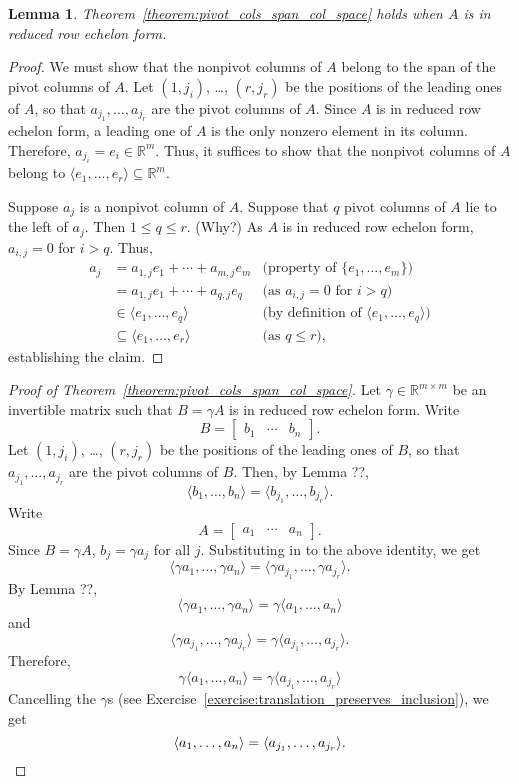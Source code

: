 \documentclass{amsart}
\newcommand{\RR}{\mathbb{R}}
\newtheorem{lemma}[theorem]{Lemma}
\theoremstyle{definition}
\begin{document}
\begin{lemma}
Theorem~\ref{theorem:pivot_cols_span_col_space} holds when $A$ is in reduced row echelon form.
\end{lemma}

\begin{proof}
We must show that the nonpivot columns of $A$ belong to the span of the pivot columns of $A$.
Let $(1, j_i)$, \ldots, $(r, j_r)$ be the positions of the leading ones of $A$, so that $a_{j_1},\ldots,a_{j_r}$ are the pivot columns of $A$.
Since $A$ is in reduced row echelon form, a leading one of $A$ is the only nonzero element in its column.
Therefore, $a_{j_i}=e_i\in\RR^m.$
Thus, it suffices to show that the nonpivot columns of $A$ belong to $\langle e_1,\ldots,e_r\rangle\subseteq \RR^m$.

Suppose $a_j$ is a nonpivot column of $A$.
Suppose that $q$ pivot columns of $A$ lie to the left of $a_j$.
Then $1\leq q\leq r$. (Why?)
As $A$ is in reduced row echelon form, $a_{i,j}=0$ for $i>q$.
Thus,
\begin{align*}
a_j &= a_{1,j}e_1 + \cdots + a_{m,j}e_m &\text{(property of $\{e_1,\ldots,e_m\}$)}\\
&= a_{1,j}e_1 + \cdots + a_{q,j}e_q &\text{(as $a_{i,j}=0$ for $i>q$)}\\
& \in \langle e_1,\ldots,e_q\rangle &\text{(by definition of $\langle e_1,\ldots,e_q\rangle$)}\\
&\subseteq \langle e_1,\ldots,e_r\rangle &\text{(as $q\leq r$)},
\end{align*}
establishing the claim.
\end{proof}

\begin{proof}[{Proof of Theorem~\ref{theorem:pivot_cols_span_col_space}}]
Let $\gamma\in\RR^{m\times m}$ be an invertible matrix such that $B= \gamma A$ is in reduced row echelon form. 
Write
$$
B=\begin{bmatrix}b_1&\cdots&b_n\end{bmatrix}.
$$
Let $(1, j_i)$, \ldots, $(r, j_r)$ be the positions of the leading ones of $B$, so that $a_{j_1},\ldots,a_{j_r}$ are the pivot columns of $B$.
Then, by Lemma ??,
$$
\langle b_1,\ldots,b_n\rangle = \langle b_{j_1},\ldots,b_{j_r}\rangle.
$$
Write
$$
A=\begin{bmatrix}a_1&\cdots&a_n\end{bmatrix}.
$$
Since $B=\gamma A$, $b_j = \gamma a_j$ for all $j$. Substituting in to the above identity, we get
$$
\langle \gamma a_1,\ldots,\gamma a_n\rangle = \langle \gamma a_{j_1},\ldots,\gamma a_{j_r}\rangle.
$$
By Lemma ??,
$$
\langle \gamma a_1,\ldots,\gamma a_n\rangle = \gamma \langle a_1,\ldots,a_n\rangle
$$
and
$$
\langle \gamma a_{j_1},\ldots,\gamma a_{j_r}\rangle = \gamma \langle a_{j_1},\ldots,a_{j_r}\rangle.
$$
Therefore,
$$
\gamma \langle a_1,\ldots,a_n\rangle = \gamma \langle a_{j_1},\ldots,a_{j_r}\rangle
$$
Cancelling the $\gamma$s (see Exercise~\ref{exercise:translation_preserves_inclusion}),  we get
\[
\langle a_1,\ldots,a_n\rangle =  \langle a_{j_1},\ldots,a_{j_r}\rangle\qedhere.
\]
\end{proof}
\end{document}
